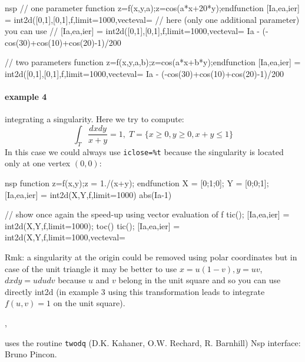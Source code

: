 \begin{examples}
\begin{mintednsp}{nsp}
// one parameter
function z=f(x,y,a);z=cos(a*x+20*y);endfunction
[Ia,ea,ier] = int2d([0,1],[0,1],f,limit=1000,vecteval=%
// here (only one additional parameter) you can use
// [Ia,ea,ier] = int2d([0,1],[0,1],f,limit=1000,vecteval=%
Ia - (-cos(30)+cos(10)+cos(20)-1)/200

// two parameters
function z=f(x,y,a,b);z=cos(a*x+b*y);endfunction
[Ia,ea,ier] = int2d([0,1],[0,1],f,limit=1000,vecteval=%
Ia - (-cos(30)+cos(10)+cos(20)-1)/200
\end{mintednsp}

\paragraph{example 4} integrating a singularity. Here we try to compute:
$$
    \int_T \frac{dxdy}{x+y} = 1, \; T = \{ x \ge 0, y \ge 0, x+y \le 1 \}
$$ 
In this case we could always use \verb+iclose=%t+ because the singularity is
located only at one vertex $(0,0)$:
\begin{mintednsp}{nsp}
function z=f(x,y);z = 1./(x+y); endfunction
X = [0;1;0]; Y = [0;0;1];
[Ia,ea,ier] = int2d(X,Y,f,limit=1000)
abs(Ia-1)

// show once again the speed-up using vector evaluation of f
tic(); [Ia,ea,ier] = int2d(X,Y,f,limit=1000); toc()
tic(); [Ia,ea,ier] = int2d(X,Y,f,limit=1000,vecteval=%
\end{mintednsp}
Rmk: a singularity at the origin could be removed using polar
coordinates but in case of the unit triangle it may be better
to use $x = u(1-v), y = uv$, $dxdy = u dudv$ because $u$ and $v$
belong in the unit square and so you can use directly int2d
(in example 3 using this transformation leads to integrate $f(u,v)=1$
on the unit square). 
\end{examples}

\begin{manseealso}
  ,   
\end{manseealso}

\begin{authors}
  uses the routine \verb!twodq! (D.K. Kahaner, O.W. Rechard, R. Barnhill)
  Nsp interface: Bruno Pincon.
\end{authors}
